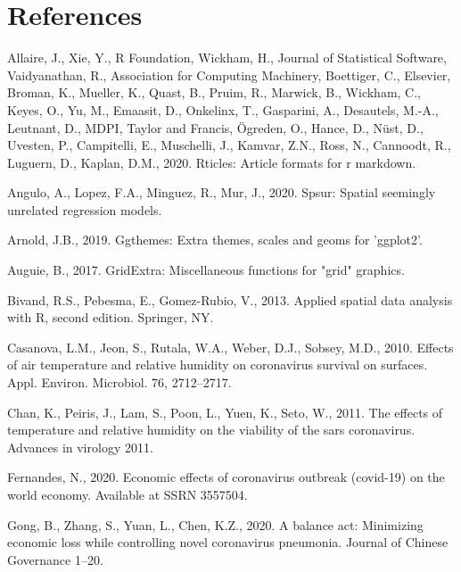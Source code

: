 \documentclass[]{elsarticle} %
\begin{document}
\hypertarget{references}{%
\section*{References}\label{references}}

\hypertarget{refs}{}
\leavevmode\hypertarget{ref-Allaire2020}{}%
Allaire, J., Xie, Y., R Foundation, Wickham, H., Journal of Statistical
Software, Vaidyanathan, R., Association for Computing Machinery,
Boettiger, C., Elsevier, Broman, K., Mueller, K., Quast, B., Pruim, R.,
Marwick, B., Wickham, C., Keyes, O., Yu, M., Emaasit, D., Onkelinx, T.,
Gasparini, A., Desautels, M.-A., Leutnant, D., MDPI, Taylor and Francis,
Ögreden, O., Hance, D., Nüst, D., Uvesten, P., Campitelli, E.,
Muschelli, J., Kamvar, Z.N., Ross, N., Cannoodt, R., Luguern, D.,
Kaplan, D.M., 2020. Rticles: Article formats for r markdown.

\leavevmode\hypertarget{ref-Angulo2020spsur}{}%
Angulo, A., Lopez, F.A., Minguez, R., Mur, J., 2020. Spsur: Spatial
seemingly unrelated regression models.

\leavevmode\hypertarget{ref-Arnold2019}{}%
Arnold, J.B., 2019. Ggthemes: Extra themes, scales and geoms for
'ggplot2'.

\leavevmode\hypertarget{ref-Auguie2017gridextra}{}%
Auguie, B., 2017. GridExtra: Miscellaneous functions for "grid"
graphics.

\leavevmode\hypertarget{ref-Bivand2013}{}%
Bivand, R.S., Pebesma, E., Gomez-Rubio, V., 2013. Applied spatial data
analysis with R, second edition. Springer, NY.

\leavevmode\hypertarget{ref-Casanova2010effects}{}%
Casanova, L.M., Jeon, S., Rutala, W.A., Weber, D.J., Sobsey, M.D., 2010.
Effects of air temperature and relative humidity on coronavirus survival
on surfaces. Appl. Environ. Microbiol. 76, 2712--2717.

\leavevmode\hypertarget{ref-Chan2011effects}{}%
Chan, K., Peiris, J., Lam, S., Poon, L., Yuen, K., Seto, W., 2011. The
effects of temperature and relative humidity on the viability of the
sars coronavirus. Advances in virology 2011.

\leavevmode\hypertarget{ref-Fernandes2020economic}{}%
Fernandes, N., 2020. Economic effects of coronavirus outbreak (covid-19)
on the world economy. Available at SSRN 3557504.

\leavevmode\hypertarget{ref-Gong2020balance}{}%
Gong, B., Zhang, S., Yuan, L., Chen, K.Z., 2020. A balance act:
Minimizing economic loss while controlling novel coronavirus pneumonia.
Journal of Chinese Governance 1--20.
\end{document}
